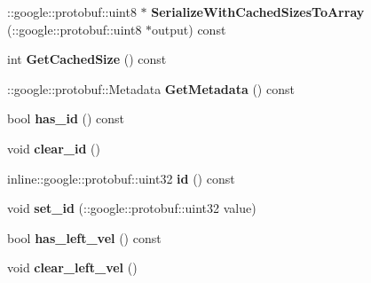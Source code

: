 \begin{DoxyCompactItemize}
\item 
\hypertarget{classvss__command_1_1Robot__Command_ab3447c593d9b6135979822bad4903648}{\-::google\-::protobuf\-::uint8 $\ast$ {\bfseries Serialize\-With\-Cached\-Sizes\-To\-Array} (\-::google\-::protobuf\-::uint8 $\ast$output) const }\label{classvss__command_1_1Robot__Command_ab3447c593d9b6135979822bad4903648}

\item 
\hypertarget{classvss__command_1_1Robot__Command_a45dc66dc5c38e988073141707b083dae}{int {\bfseries Get\-Cached\-Size} () const }\label{classvss__command_1_1Robot__Command_a45dc66dc5c38e988073141707b083dae}

\item 
\hypertarget{classvss__command_1_1Robot__Command_a5383c49b5b6ef83dc3b9ac3ab2dd870a}{\-::google\-::protobuf\-::\-Metadata {\bfseries Get\-Metadata} () const }\label{classvss__command_1_1Robot__Command_a5383c49b5b6ef83dc3b9ac3ab2dd870a}

\item 
\hypertarget{classvss__command_1_1Robot__Command_ab636015fe88af27ccaf824159805442d}{bool {\bfseries has\-\_\-id} () const }\label{classvss__command_1_1Robot__Command_ab636015fe88af27ccaf824159805442d}

\item 
\hypertarget{classvss__command_1_1Robot__Command_a0b684f61267d6e251f068f1b2a4c772f}{void {\bfseries clear\-\_\-id} ()}\label{classvss__command_1_1Robot__Command_a0b684f61267d6e251f068f1b2a4c772f}

\item 
\hypertarget{classvss__command_1_1Robot__Command_a632b1e7c37152ca3ecca6e45547faa94}{inline\-::google\-::protobuf\-::uint32 {\bfseries id} () const }\label{classvss__command_1_1Robot__Command_a632b1e7c37152ca3ecca6e45547faa94}

\item 
\hypertarget{classvss__command_1_1Robot__Command_a7aa38699c29bd2037112084fbb833efe}{void {\bfseries set\-\_\-id} (\-::google\-::protobuf\-::uint32 value)}\label{classvss__command_1_1Robot__Command_a7aa38699c29bd2037112084fbb833efe}

\item 
\hypertarget{classvss__command_1_1Robot__Command_aba5afdfa1c9844cbea2b8b5c1f9a3a71}{bool {\bfseries has\-\_\-left\-\_\-vel} () const }\label{classvss__command_1_1Robot__Command_aba5afdfa1c9844cbea2b8b5c1f9a3a71}

\item 
\hypertarget{classvss__command_1_1Robot__Command_a728166b3b1a62583a6e46545b5ad44c7}{void {\bfseries clear\-\_\-left\-\_\-vel} ()}\label{classvss__command_1_1Robot__Command_a728166b3b1a62583a6e46545b5ad44c7}


\end{DoxyCompactItemize}
